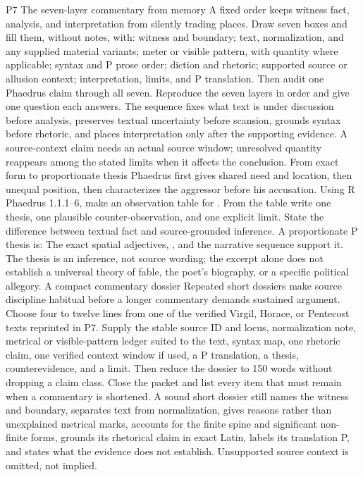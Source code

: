\begin{courseunit}{P7}
\SubmoduleExtension
  {The seven-layer commentary from memory}
  {A fixed order keeps witness fact, analysis, and interpretation from
  silently trading places.}
  {Draw seven boxes and fill them, without notes, with: witness and boundary;
  text, normalization, and any supplied material variants; meter or visible
  pattern, with quantity where applicable; syntax and P prose order;
  diction and rhetoric; supported source or allusion context; interpretation,
  limits, and P translation. Then audit one Phaedrus claim through all seven.}
  {Reproduce the seven layers in order and give one question each answers.}
  {The sequence fixes what text is under discussion before analysis, preserves
  textual uncertainty before scansion, grounds syntax before rhetoric, and
  places interpretation only after the supporting evidence. A source-context
  claim needs an actual source window; unresolved quantity reappears among the
  stated limits when it affects the conclusion.}
\SubmoduleExtension
  {From exact form to proportionate thesis}
  {Phaedrus first gives shared need and location, then unequal position, then
  characterizes the aggressor before his accusation.}
  {Using R Phaedrus 1.1.1--6, make an observation table for
  . From the table write one thesis, one plausible
  counter-observation, and one explicit limit.}
  {State the difference between textual fact and source-grounded inference.}
  {A proportionate P thesis is:  The exact spatial adjectives, , and the narrative
  sequence support it. The thesis is an inference, not source wording; the
  excerpt alone does not establish a universal theory of fable, the poet's
  biography, or a specific political allegory.}
\SubmoduleExtension
  {A compact commentary dossier}
  {Repeated short dossiers make source discipline habitual before a longer
  commentary demands sustained argument.}
  {Choose four to twelve lines from one of the verified Virgil, Horace, or
  Pentecost texts reprinted in P7. Supply the stable source ID and locus,
  normalization note, metrical or visible-pattern ledger suited to the text,
  syntax map, one rhetoric claim, one verified context window if used, a P
  translation, a thesis, counterevidence, and a limit. Then reduce the dossier
  to 150 words without dropping a claim class.}
  {Close the packet and list every item that must remain when a commentary is
  shortened.}
  {A sound short dossier still names the witness and boundary, separates text
  from normalization, gives reasons rather than unexplained metrical marks,
  accounts for the finite spine and significant non-finite forms, grounds its
  rhetorical claim in exact Latin, labels its translation P, and states what
  the evidence does not establish. Unsupported source context is omitted, not
  implied.}
\end{courseunit}

